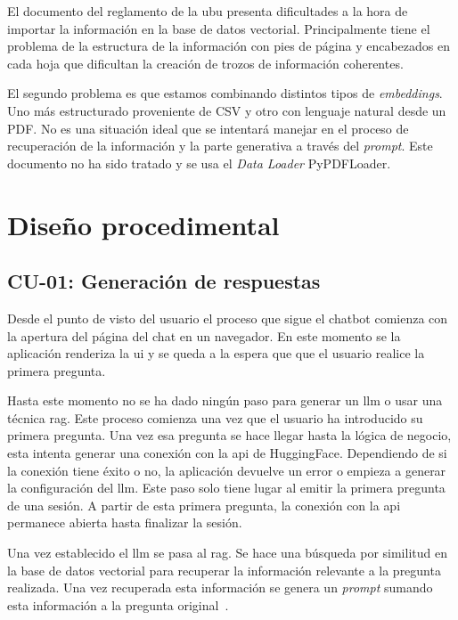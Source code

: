 El documento del reglamento de la \acrshort{ubu} presenta dificultades a la hora de importar la información en la base de datos vectorial. Principalmente tiene el problema de la estructura de la información con pies de página y encabezados en cada hoja que dificultan la creación de trozos de información coherentes. 

El segundo problema es que estamos combinando distintos tipos de \textit{embeddings}. Uno más estructurado proveniente de CSV y otro con lenguaje natural desde un PDF. No es una situación ideal que se intentará manejar en el proceso de recuperación de la información y la parte generativa a través del \textit{prompt}. Este documento no ha sido tratado y se usa el \textit{Data Loader} PyPDFLoader.

\newpage
\section{Diseño procedimental}

\subsection{CU-01: Generación de respuestas}

Desde el punto de visto del usuario el proceso que sigue el chatbot comienza con la apertura del página del chat en un navegador. En este momento se la aplicación renderiza la \acrshort{ui} y se queda a la espera que que el usuario realice la primera pregunta.

Hasta este momento no se ha dado ningún paso para generar un \acrshort{llm} o usar una técnica \acrshort{rag}. Este proceso comienza una vez que el usuario ha introducido su primera pregunta. Una vez esa pregunta se hace llegar hasta la lógica de negocio, esta intenta generar una conexión con la \acrshort{api} de HuggingFace. Dependiendo de si la conexión tiene éxito o no, la aplicación devuelve un error o empieza a generar la configuración del \acrshort{llm}. Este paso solo tiene lugar al emitir la primera pregunta de una sesión. A partir de esta primera pregunta, la conexión con la \acrshort{api} permanece abierta hasta finalizar la sesión.

Una vez establecido el \acrshort{llm} se pasa al \acrshort{rag}. Se hace una búsqueda por similitud en la base de datos vectorial para recuperar la información relevante a la pregunta realizada. Una vez recuperada esta información se genera un \textit{prompt} sumando esta información a la pregunta original~\cite{Lewis2020}.

